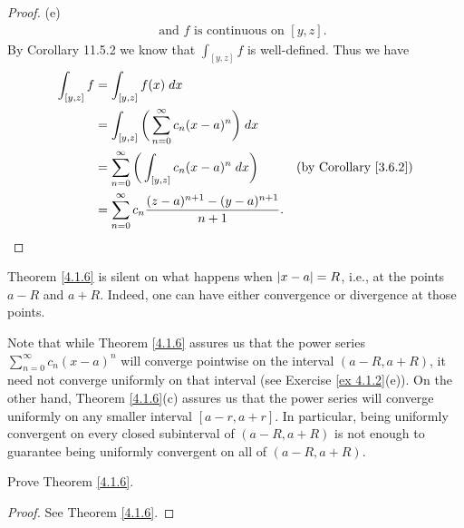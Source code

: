\begin{proof}{(e)}
\begin{align*}
         & \text{ and } f \text{ is continuous on } [y, z].
    \end{align*}
    By Corollary 11.5.2 we know that \(\int_{[y, z]} f\) is well-defined.
    Thus we have
    \begin{align*}
        \int_{[y, z]} f & = \int_{[y, z]} f(x) \; dx                                                                                     \\
                        & = \int_{[y, z]} \bigg(\sum_{n = 0}^\infty c_n (x - a)^n\bigg) \; dx                                            \\
                        & = \sum_{n = 0}^\infty \bigg(\int_{[y, z]} c_n (x - a)^n \; dx\bigg)        & \text{(by Corollary \ref{3.6.2})} \\
                        & = \sum_{n = 0}^\infty c_n \frac{(z - a)^{n + 1} - (y - a)^{n + 1}}{n + 1}.
    \end{align*}
\end{proof}

\setcounter{theorem}{7}
\begin{remark}\label{4.1.8}
    Theorem \ref{4.1.6} is silent on what happens when \(\abs*{x - a} = R\), i.e., at the points \(a - R\) and \(a + R\).
    Indeed, one can have either convergence or divergence at those points.
\end{remark}

\begin{remark}\label{4.1.9}
    Note that while Theorem \ref{4.1.6} assures us that the power series \(\sum_{n = 0}^\infty c_n (x - a)^n\) will converge pointwise on the interval \((a - R, a + R)\), it need not converge uniformly on that interval
    (see Exercise \ref{ex 4.1.2}(e)).
    On the other hand, Theorem \ref{4.1.6}(c) assures us that the power series will converge uniformly on any smaller interval \([a - r, a + r]\).
    In particular, being uniformly convergent on every closed subinterval of \((a - R, a + R)\) is not enough to guarantee being uniformly convergent on all of \((a - R, a + R)\).
\end{remark}

\exercisesection

\begin{exercise}\label{ex 4.1.1}
    Prove Theorem \ref{4.1.6}.
\end{exercise}

\begin{proof}
    See Theorem \ref{4.1.6}.
\end{proof}

